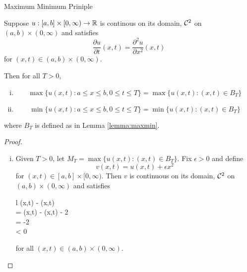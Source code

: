 \begin{section}{Maximum Minimum Priniple}

\begin{thrm}\label{thrm:maxmin}	
	Suppose $u:[a,b] \times [0,\infty) \to \real$ is
	continous on its domain, $\ctsdiff[2]$ on $(a,b) \times
	(0,\infty)$ and satisfies
		\begin{displaymath}
			\frac{\partial u}{\partial t}(x,t)
				= \frac{\partial^2 u}{\partial x^2}(x,t)
		\end{displaymath}
	for $(x,t) \in (a,b) \times (0,\infty)$.
	
	Then for all $T > 0$,
		\begin{enumerate}[i)]
			\item
				\begin{displaymath}
					\max \{u(x,t):a \leq x \leq b, 0 \leq t \leq T\}
						= \max \{u(x,t):(x,t) \in B_T\}
				\end{displaymath}

			\item
				\begin{displaymath}
					\min \{u(x,t):a \leq x \leq b, 0 \leq t \leq T\}
						= \min \{u(x,t):(x,t) \in B_T\}
				\end{displaymath}
		\end{enumerate}		
	where $B_T$ is defined as in Lemma \ref{lemma:maxmin}.
\end{thrm}

\begin{proof}
	\begin{enumerate}[i)]
		\item
			Given $T > 0$, let $M_T = \max \{u(x,t):(x,t) \in B_T\}$.
			Fix $\epsilon > 0$ and define
				\begin{displaymath}
					v(x,t) = u(x,t) + \epsilon x^2
				\end{displaymath}
			for $(x,t) \in [a,b] \times [0,\infty)$. Then $v$ is
			continuous on its domain, $\ctsdiff[2]$ on $(a,b)
			\times (0,\infty)$ and satisfies
				\begin{IEEEeqnarray*}{l}
					(x,t)
						- (x,t) \\
					= (x,t)
						- (x,t)
						- 2 \epsilon \\
					= -2 \epsilon \\
					< 0
				\end{IEEEeqnarray*}
			for all $(x,t) \in (a,b) \times (0,\infty)$.
	

\end{enumerate}
\end{proof}
\end{section}
